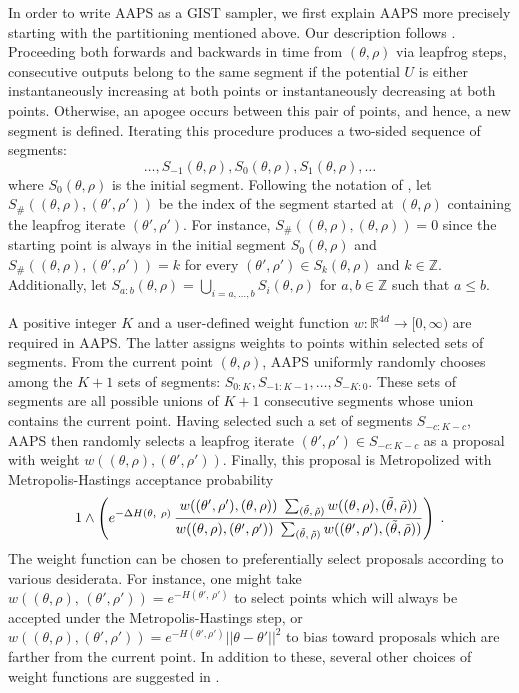 \documentclass[letterpaper,11pt]{article}
\theoremstyle{plain}%
\theoremstyle{remark}
\begin{document}
In order to write AAPS as a GIST sampler, we first explain AAPS more precisely starting with the partitioning mentioned above. Our description follows \cite{SherlockUrbasLudkin2023Apogee}.  Proceeding both forwards and backwards in time from $(\theta, \rho)$  via leapfrog steps, consecutive outputs belong to the same segment if the potential $U$ is either instantaneously increasing at both points or instantaneously decreasing at both points. Otherwise, an apogee occurs between this pair of points, and hence, a new segment is defined. Iterating this procedure produces a two-sided sequence of segments: \[
\dots, S_{-1}(\theta, \rho), S_0(\theta, \rho), S_1(\theta, \rho), \dots 
\] 
where $ S_0(\theta, \rho)$ is the initial segment.  Following the notation of \cite{SherlockUrbasLudkin2023Apogee}, let $S_\#((\theta, \rho), (\theta', \rho'))$ be the index of the segment started at $(\theta, \rho)$ containing the leapfrog iterate $(\theta', \rho')$. For instance, $S_\#((\theta, \rho), (\theta, \rho)) = 0$ since the starting point is always in the initial segment $S_0(\theta, \rho)$ and $S_\#((\theta, \rho), (\theta', \rho')) = k$ for every $(\theta', \rho') \in S_k(\theta, \rho)$ and $k \in \mathbb{Z}$. Additionally, let $S_{a:b}(\theta, \rho) = \bigcup_{i = a, \dots, b} S_i(\theta, \rho)$ for $a, b \in \mathbb{Z}$ such that $a \le b$.

A positive integer $K$ and a user-defined weight function $w: \mathbb{R}^{4d} \to [0, \infty)$ are required in AAPS.  The latter assigns weights to points within selected sets of segments. From the current point $(\theta, \rho)$, AAPS uniformly randomly chooses among the $K+1$ sets of segments: $S_{0:K}, S_{-1:K-1}, \dots, S_{-K:0}$. These sets of segments are all possible unions of $K+1$ consecutive segments whose union contains the current point. Having selected such a set of segments $S_{-c:K-c}$, AAPS then randomly selects a leapfrog iterate $(\theta', \rho') \in S_{-c:K-c}$ as a proposal with weight $w((\theta, \rho), (\theta', \rho'))$. Finally, this proposal is Metropolized with Metropolis-Hastings acceptance probability
\begin{equation} \label{eq:acceptanceprobability_AAPS}   
1 \wedge \left( e^{-\Delta H(\theta, \ \rho)} \,  \frac{ w((\theta', \rho'), (\theta, \rho)) \ \sum_{(\Tilde{\theta}, \, \Tilde{\rho})} w((\theta, \rho), (\Tilde{\theta}, \Tilde{\rho}))}{ w((\theta, \rho), (\theta',\rho')) \ \sum_{(\Tilde{\theta}, \, \Tilde{\rho})} w((\theta', \rho'), (\Tilde{\theta}, \Tilde{\rho})) } \right) \;. \end{equation}
The weight function can be chosen to preferentially select proposals according to various desiderata. For instance, one might take $w((\theta,\rho),\,(\theta',\rho')) = e^{-H(\theta',\, \rho')}$ to select points which will always be accepted under the Metropolis-Hastings step, or $w((\theta, \rho), (\theta',\rho')) = e^{-H(\theta', \rho')} || \theta - \theta'||^2$ to bias toward proposals which are farther from the current point. In addition to these, several other choices of weight functions are suggested in \cite{SherlockUrbasLudkin2023Apogee}. 
\end{document}
